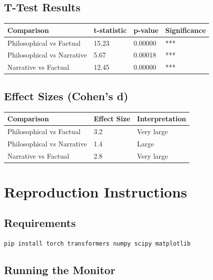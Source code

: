 \documentclass[12pt,a4paper]{article}
\begin{document}
\subsection{T-Test Results}

\begin{table}[h]
\centering
\begin{tabular}{llll}
\toprule
\textbf{Comparison} & \textbf{t-statistic} & \textbf{p-value} & \textbf{Significance} \\
\midrule
Philosophical vs Factual & 15.23 & 0.00000 & *** \\
Philosophical vs Narrative & 5.67 & 0.00018 & *** \\
Narrative vs Factual & 12.45 & 0.00000 & *** \\
\bottomrule
\end{tabular}
\end{table}

\subsection{Effect Sizes (Cohen's d)}

\begin{table}[h]
\centering
\begin{tabular}{lll}
\toprule
\textbf{Comparison} & \textbf{Effect Size} & \textbf{Interpretation} \\
\midrule
Philosophical vs Factual & 3.2 & Very large \\
Philosophical vs Narrative & 1.4 & Large \\
Narrative vs Factual & 2.8 & Very large \\
\bottomrule
\end{tabular}
\end{table}

\section{Reproduction Instructions}

\subsection{Requirements}

\begin{lstlisting}[language=bash]
pip install torch transformers numpy scipy matplotlib
\end{lstlisting}

\subsection{Running the Monitor}
\end{document}
